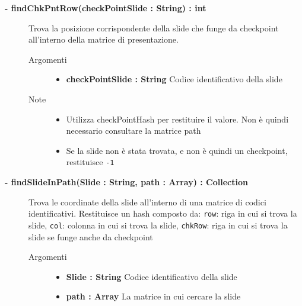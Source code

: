 \begin{description}
	\begin{description}
		\item[\textbf{\color{blue}- findChkPntRow(checkPointSlide : String) : int			}] \hfill
			Trova la posizione corrispondente della slide che funge da checkpoint all'interno della matrice di presentazione.
			
		\begin{description}
			\item[Argomenti] \hfill
				\begin{itemize}
				
					\item \textbf{checkPointSlide : String		} \hfill
					Codice identificativo della slide
					
				\end{itemize}
			\item[Note] \hfill
			\begin{itemize}
					\item Utilizza checkPointHash per restituire il valore. Non è quindi necessario consultare la matrice path
					\item Se la slide non è stata trovata, e non è quindi un checkpoint, restituisce \texttt{-1}
			\end{itemize}
		\end{description}
	\end{description}
	
	\begin{description}
		\item[\textbf{\color{blue}- findSlideInPath(Slide : String, path : Array) : Collection			}] \hfill
			Trova le coordinate della slide all'interno di una matrice di codici identificativi. Restituisce un hash composto da: \texttt{row}: riga in cui si trova la slide, \texttt{col}: colonna in cui si trova la slide, \texttt{chkRow}: riga in cui si trova la slide se funge anche da checkpoint
			
		\begin{description}
			\item[Argomenti] \hfill
				\begin{itemize}
				
					\item \textbf{Slide : String		} \hfill
					Codice identificativo della slide
					\item \textbf{path : Array		} \hfill
					La matrice in cui cercare la slide
					

\end{itemize}
\end{description}
\end{description}
\end{description}
